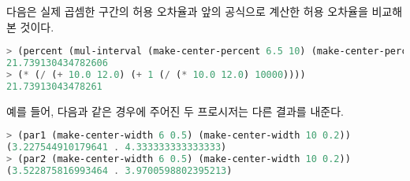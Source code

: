 다음은 실제 곱셈한 구간의 허용 오차율과 앞의 공식으로 계산한 허용 오차율을
비교해 본 것이다.

\begin{lstlisting}[language=Scheme]
> (percent (mul-interval (make-center-percent 6.5 10) (make-center-percent 5 12)))
21.739130434782606
> (* (/ (+ 10.0 12.0) (+ 1 (/ (* 10.0 12.0) 10000))))
21.73913043478261
\end{lstlisting}


예를 들어, 다음과 같은 경우에 주어진 두 프로시저는 다른 결과를 내준다.
\begin{lstlisting}[language=Scheme]
> (par1 (make-center-width 6 0.5) (make-center-width 10 0.2))
(3.227544910179641 . 4.333333333333333)
> (par2 (make-center-width 6 0.5) (make-center-width 10 0.2))
(3.522875816993464 . 3.9700598802395213)
\end{lstlisting}






